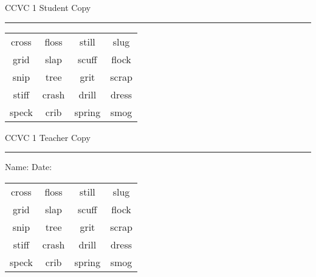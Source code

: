 \documentclass{memoir}
\begin{document}

\footnotesize \noindent
CCVC 1 \hfill Student Copy
\smallskip
\hrule

\Large

\setlength{\tabcolsep}{14pt}
\def\arraystretch{3}

{\selectfont


\begin{vplace}[0.5]
\begin{center}
\begin{tabular}{cccc}
cross & floss & still & slug \\
grid & slap            & scuff & flock \\
snip & tree & grit      & scrap \\
stiff & crash & drill & dress \\
speck & crib & spring & smog \\
\end{tabular}
\end{center}
\end{vplace}

}

\newpage

\footnotesize \noindent
CCVC 1 \hfill Teacher Copy
\smallskip
\hrule

\normalsize

\vfill

\noindent
Name: \underline{\hspace{1.75in}} \hfill Date: \underline{\hspace{1in}}

\Large

{\selectfont


\begin{vplace}[0.5]
\begin{center}
\begin{tabular}{cccc}
cross & floss & still & slug \\
grid & slap            & scuff & flock \\
snip & tree & grit      & scrap \\
stiff & crash & drill & dress \\
speck & crib & spring & smog \\
\end{tabular}
\end{center}
\end{vplace}



}
\end{document}
